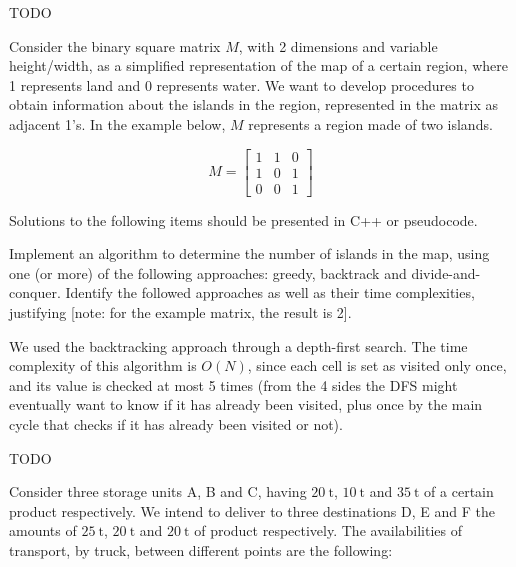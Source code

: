 {
\renewcommand{\thechapter}{\arabic{chapter}N}
\setcounter{chapter}{18}


TODO


Consider the binary square matrix $M$, with 2 dimensions and variable height/width, as a simplified representation of the map of a certain region, where 1 represents land and 0 represents water. We want to develop procedures to obtain information about the islands in the region, represented in the matrix as adjacent 1's. In the example below, $M$ represents a region made of two islands.

\begin{equation*}
    M = \begin{bmatrix}
        1 & 1 & 0 \\
        1 & 0 & 1 \\
        0 & 0 & 1
    \end{bmatrix}
\end{equation*}

Solutions to the following items should be presented in C++ or pseudocode.

Implement an algorithm to determine the number of islands in the map, using one (or more) of the following approaches: greedy, backtrack and divide-and-conquer. Identify the followed approaches as well as their time complexities, justifying [note: for the example matrix, the result is 2].

\ansseparator



We used the backtracking approach through a depth-first search. The time complexity of this algorithm is $O(N)$, since each cell is set as visited only once, and its value is checked at most 5 times (from the 4 sides the DFS might eventually want to know if it has already been visited, plus once by the main cycle that checks if it has already been visited or not).


TODO

Consider three storage units A, B and C, having $\SI{20}{\tonne}$, $\SI{10}{\tonne}$ and $\SI{35}{\tonne}$ of a certain product respectively. We intend to deliver to three destinations D, E and F the amounts of $\SI{25}{\tonne}$, $\SI{20}{\tonne}$ and $\SI{20}{\tonne}$ of product respectively. The availabilities of transport, by truck, between different points are the following:

}
